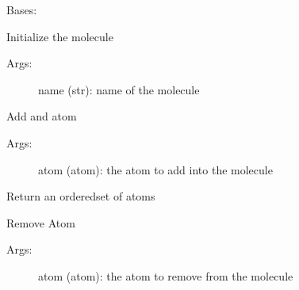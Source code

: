 \documentclass[letterpaper,10pt,english]{sphinxmanual}
\begin{document}
\begin{fulllineitems}
\label{molecule:ctools.Molecule.Molecule}
Bases: 

Initialize the molecule
\begin{description}
\item[{Args:}] \leavevmode
name (str): name of the molecule

\end{description}


\begin{fulllineitems}
\label{molecule:ctools.Molecule.Molecule.addAtom}
Add and atom
\begin{description}
\item[{Args:}] \leavevmode
atom (atom): the atom to add into the molecule

\end{description}

\end{fulllineitems}



\begin{fulllineitems}
\label{molecule:ctools.Molecule.Molecule.getAtoms}
Return an orderedset of atoms

\end{fulllineitems}



\begin{fulllineitems}
\label{molecule:ctools.Molecule.Molecule.removeAtom}
Remove Atom
\begin{description}
\item[{Args:}] \leavevmode
atom (atom): the atom to remove from the molecule

\end{description}

\end{fulllineitems}


\end{fulllineitems}
\end{document}
